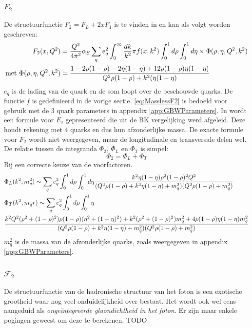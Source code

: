 \documentclass[a4paper,11pt]{article}
\numberwithin{equation}{section} %
\begin{document}
    \subsubsection{$F_2$} \label{sec:SF}
De structuurfunctie $F_2 = F_L + 2x F_1$ is te vinden in \cite[vgl. 9.200]{Barone} en kan als volgt worden geschreven:
\begin{align} \label{eq:MasslessF2}
F_2(x,Q^2) &= \frac{Q^2}{4\pi^2} \alpha_S \sum_q e_q^2 \int_0^\infty \frac{dk}{k^2}\pi f(x,k^2) \int_0^1 d\rho \int_0^1 d\eta \times \Phi(\rho, \eta, Q^2, k^2) \\
\text{met } \Phi(\rho, \eta, Q^2, k^2) &= \frac{1-2\rho(1-\rho)-2\eta(1-\eta)+12\rho(1-\rho)\eta(1-\eta)}{Q^2 \rho(1-\rho) + k^2 (\eta(1-\eta)}\notag
\end{align}
$e_q$ is de lading van de quark en de som loopt over de beschouwde quarks.
De functie $f$ is gedefinieerd in de vorige sectie.
\eqref{eq:MasslessF2} is bedoeld voor gebruik met de 3 quark parameters in appendix \ref{app:GBWParameters}.
In \cite{Bondarenko} wordt een formule voor $F_2$ gepresenteerd die uit de BK vergelijking werd afgeleid.
Deze houdt rekening met 4 quarks en dus hun afzonderlijke massa.
De exacte formule voor $F_2$ wordt niet weergegeven, maar de longitudinale en transversale delen wel.
De relatie tussen de integranda $\Phi_2$, $\Phi_L$ en $\Phi_T$ is simpel:
\begin{equation}
\Phi_2 = \Phi_L + \Phi_T
\end{equation}
Bij een correcte keuze van de voorfactoren.
\begin{align}
&\Phi_L(k^2, m_q^2) \sim \sum_q e_q^2 \int_0^1 d\rho \int_0^1 d\eta \frac{k^2 \eta(1-\eta)\rho^2(1-\rho)^2 Q^2}{(Q^2\rho(1-\rho)+k^2\eta(1-\eta)+m_q^2)(Q^2\rho(1-\rho)+m_q^2)} \\
&\Phi_T(k^2, m_q^^2) \sim \sum_q e_q^2 \int_0^1 d\rho \int_0^1 \eta \notag \\
&\frac{k^2 Q^2 (\rho^2+(1-\rho)^2)\rho(1-\rho)(\eta^2+(1-\eta)^2)+k^2(\rho^2+(1-\rho)^2)m_q^2 + 4\rho(1-\rho)\eta(1-\eta)m_q^2}{(Q^2\rho(1-\rho)+k^2\eta(1-\eta)+m_q^2)(Q^2\rho(1-\rho)+m_q^2)}
\end{align}
$m_q^2$ is de massa van de afzonderlijke quarks, zoals weergegeven in appendix \ref{app:GBWParameters}.

    \subsubsection{$\mathcal{F}_2$} \label{sec:UGD}
De structuurfunctie van de hadronische structuur van het foton is een exotische grootheid waar nog veel onduidelijkheid over bestaat.
Het wordt ook wel eens aangeduid als \textit{ongeïntegreerde gluondichtheid in het foton}.
Er zijn maar enkele pogingen geweest om deze te berekenen.
TODO
\end{document}
